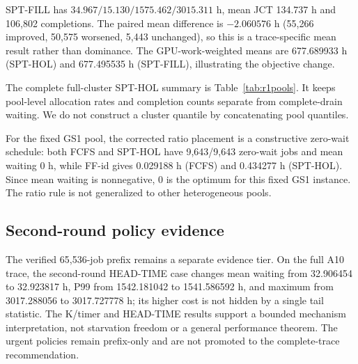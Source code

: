 SPT-FILL has $34.967/15.130/1575.462/3015.311$ h, mean JCT 134.737 h and 106,802 completions. The paired mean difference is $-2.060576$ h (55,266 improved, 50,575 worsened, 5,443 unchanged), so this is a trace-specific mean result rather than dominance. The GPU-work-weighted means are 677.689933 h (SPT-HOL) and 677.495535 h (SPT-FILL), illustrating the objective change.

The complete full-cluster SPT-HOL summary is Table~\ref{tab:r1pools}. It keeps pool-level allocation rates and completion counts separate from complete-drain waiting. We do not construct a cluster quantile by concatenating pool quantiles.

For the fixed GS1 pool, the corrected ratio placement is a constructive zero-wait schedule: both FCFS and SPT-HOL have 9,643/9,643 zero-wait jobs and mean waiting 0 h, while FF-id gives 0.029188 h (FCFS) and 0.434277 h (SPT-HOL). Since mean waiting is nonnegative, 0 is the optimum for this fixed GS1 instance. The ratio rule is not generalized to other heterogeneous pools.

\subsection{Second-round policy evidence}
The verified 65,536-job prefix remains a separate evidence tier. On the full A10 trace, the second-round HEAD-TIME case changes mean waiting from 32.906454 to 32.923817 h, P99 from 1542.181042 to 1541.586592 h, and maximum from 3017.288056 to 3017.727778 h; its higher cost is not hidden by a single tail statistic. The K/timer and HEAD-TIME results support a bounded mechanism interpretation, not starvation freedom or a general performance theorem. The urgent policies remain prefix-only and are not promoted to the complete-trace recommendation.
